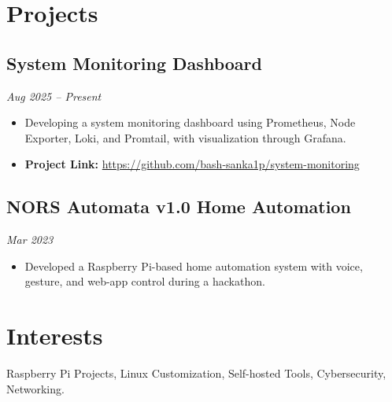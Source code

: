 \documentclass[a4paper,11pt]{article}
\begin{document}
\section*{Projects}
\subsection*{System Monitoring Dashboard}
\textit{Aug 2025 -- Present}
\begin{itemize}[leftmargin=*,labelsep=5pt]
    \item Developing a system monitoring dashboard using Prometheus, Node Exporter, Loki, and Promtail, with visualization through Grafana.
    \item \textbf{Project Link:} \href{https://github.com/bash-sanka1p/system-monitoring}{https://github.com/bash-sanka1p/system-monitoring}
\end{itemize}

\subsection*{NORS Automata v1.0 Home Automation}
\textit{Mar 2023}
\begin{itemize}[leftmargin=*,labelsep=5pt]
    \item Developed a Raspberry Pi-based home automation system with voice, gesture, and web-app control during a hackathon.
\end{itemize}

\section*{Interests}
Raspberry Pi Projects, Linux Customization, Self-hosted Tools, Cybersecurity, Networking.
\end{document}
